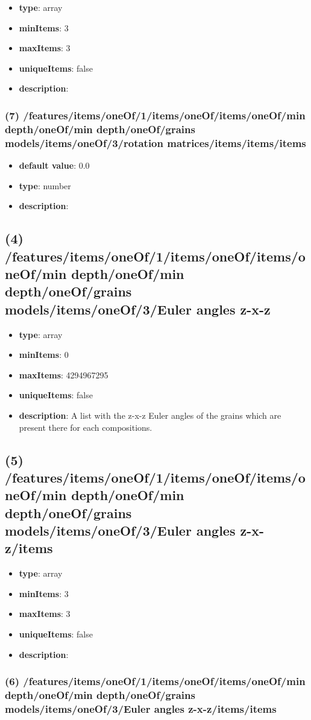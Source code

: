 \begin{itemize}[leftmargin=6em]\item {\bf type}: array
\item {\bf minItems}: 3
\item {\bf maxItems}: 3
\item {\bf uniqueItems}: false
\item {\bf description}: 
\end{itemize}\subsubsection{(7) /features/items/oneOf/1/items/oneOf/items/oneOf/min depth/oneOf/min depth/oneOf/grains models/items/oneOf/3/rotation matrices/items/items/items}
\begin{itemize}[leftmargin=7em]\item {\bf default value}: 0.0
\item {\bf type}: number
\item {\bf description}: 
\end{itemize}\subsection{(4) /features/items/oneOf/1/items/oneOf/items/oneOf/min depth/oneOf/min depth/oneOf/grains models/items/oneOf/3/Euler angles z-x-z}
\begin{itemize}[leftmargin=4em]\item {\bf type}: array
\item {\bf minItems}: 0
\item {\bf maxItems}: 4294967295
\item {\bf uniqueItems}: false
\item {\bf description}: A list with the z-x-z Euler angles of the grains which are present there for each compositions.
\end{itemize}\subsection{(5) /features/items/oneOf/1/items/oneOf/items/oneOf/min depth/oneOf/min depth/oneOf/grains models/items/oneOf/3/Euler angles z-x-z/items}
\begin{itemize}[leftmargin=5em]\item {\bf type}: array
\item {\bf minItems}: 3
\item {\bf maxItems}: 3
\item {\bf uniqueItems}: false
\item {\bf description}: 
\end{itemize}\subsubsection{(6) /features/items/oneOf/1/items/oneOf/items/oneOf/min depth/oneOf/min depth/oneOf/grains models/items/oneOf/3/Euler angles z-x-z/items/items}
